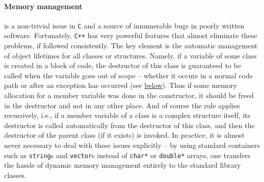 \documentclass[12pt]{article}
\newcommand{\Cpp}  {\texttt{C++}\xspace}
\let\oldparagraph\paragraph
\renewcommand{\paragraph}[1]{\vspace{-2mm}\oldparagraph{#1}}
\begin{document}
\paragraph{Memory management}  is a non-trivial issue in \texttt{C} and a source of innumerable bugs in poorly written software. Fortunately, \Cpp has very powerful features that almost eliminate these problems, if followed consistently. The key element is the automatic management of object lifetimes for all classes or structures. Namely, if a variable of some class is created in a block of code, the destructor of this class is guaranteed to be called when the variable goes out of scope -- whether it occurs in a normal code path or after an exception has occurred (see \hyperref[sec:Exceptions]{below}). Thus if some memory allocation for a member variable was done in the constructor, it should be freed in the destructor and not in any other place. And of course the rule applies recursively, i.e., if a member variable of a class is a complex structure itself, its destructor is called automatically from the destructor of this class, and then the destructor of the parent class (if it exists) is invoked. In practice, it is almost never necessary to deal with these issues explicitly -- by using standard containers such as \texttt{string}s and \texttt{vector}s instead of \texttt{char*} or \texttt{double*} arrays, one transfers the hassle of dynamic memory management entirely to the standard library classes.
\end{document}
